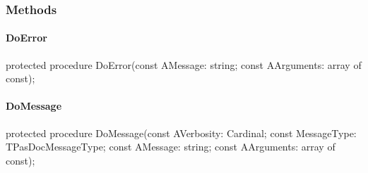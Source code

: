 \documentclass{report}
\newif\ifpdf
\begin{document}
\subsubsection*{\large{\textbf{Methods}}\normalsize\hspace{1ex}\hfill}
\paragraph*{DoError}\hspace*{\fill}

\label{PasDoc_Tokenizer.TTokenizer-DoError}
\begin{list}{}{
\setlength{\itemindent}{0cm}
\setlength{\listparindent}{0cm}
\setlength{\leftmargin}{\evensidemargin}
\addtolength{\leftmargin}{\tmplength}
\settowidth{\labelsep}{X}
\addtolength{\leftmargin}{\labelsep}
\setlength{\labelwidth}{\tmplength}
}
\item[\textbf{Declaration}\hfill]
\ifpdf
\begin{flushleft}
\fi
\begin{ttfamily}
protected procedure DoError(const AMessage: string; const AArguments: array of const);\end{ttfamily}

\ifpdf
\end{flushleft}
\fi

\end{list}
\paragraph*{DoMessage}\hspace*{\fill}

\label{PasDoc_Tokenizer.TTokenizer-DoMessage}
\begin{list}{}{
\setlength{\itemindent}{0cm}
\setlength{\listparindent}{0cm}
\setlength{\leftmargin}{\evensidemargin}
\addtolength{\leftmargin}{\tmplength}
\settowidth{\labelsep}{X}
\addtolength{\leftmargin}{\labelsep}
\setlength{\labelwidth}{\tmplength}
}
\item[\textbf{Declaration}\hfill]
\ifpdf
\begin{flushleft}
\fi
\begin{ttfamily}
protected procedure DoMessage(const AVerbosity: Cardinal; const MessageType: TPasDocMessageType; const AMessage: string; const AArguments: array of const);\end{ttfamily}

\ifpdf
\end{flushleft}
\fi

\end{list}
\end{document}
